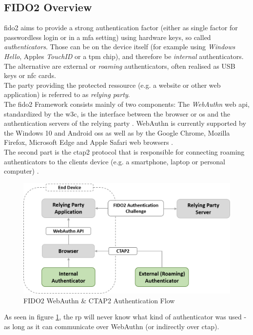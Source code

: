 


\subsection{FIDO2 Overview}
\label{subsec:fido2_webauthn}

\ac{fido2} aims to provide a strong authentication factor (either as single factor for passwordless login or in a \ac{mfa} setting) using hardware keys, so called \emph{authenticators}. Those can be on the device itself (for example using \emph{Windows Hello}, Apples \emph{TouchID} or a \ac{tpm} chip), and therefore be \emph{internal} authenticators. The alternative are external or \emph{roaming} authenticators, often realised as USB keys or \ac{nfc} cards.\\
The party providing the protected ressource (e.g. a website or other web application) is referred to as \emph{relying party}.\\
The \ac{fido2} Framework consists mainly of two components: The \emph{WebAuthn} web \ac{api}, standardized by the \ac{w3c}, is the interface between the browser or \ac{os} and the authentication servers of the relying party \cite{webauthn_standard}. WebAuthn is currently supported by the Windows 10 and Android \acp{os} as well as by the Google Chrome, Mozilla Firefox, Microsoft Edge and Apple Safari web browsers \cite{fido2_webauthn}.\\
The second part is the \ac{ctap2} protocol that is responsible for connecting roaming authenticators to the clients device (e.g. a smartphone, laptop or personal computer) \cite{fido2_overview,fido2_ctap}.\\

\begin{figure}[ht]
    \centering
    \includegraphics[width=1.8\columnwidth]{Figures/fido2_webauth_ctap_flow.png}
    \caption[FIDO2 Authentication Flow]{FIDO2 WebAuthn \& CTAP2 Authentication Flow}
    \label{fig:fido2_webauth_ctap_flow}
\end{figure}

\noindent As seen in figure \ref{fig:fido2_webauth_ctap_flow}, the \ac{rp} will never know what kind of authenticator was used - as long as it can communicate over WebAuthn (or indirectly over \ac{ctap}).
